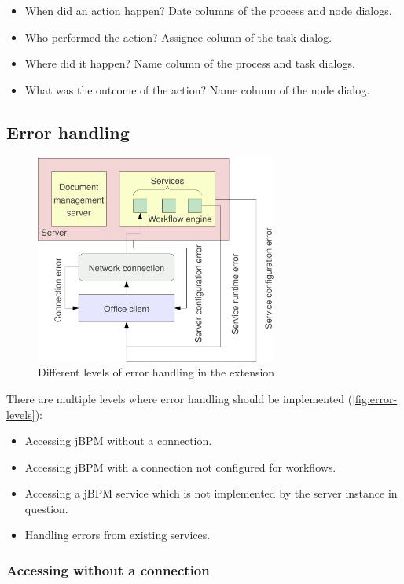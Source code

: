 \begin{itemize}
\item When did an action happen? Date columns of the process and node dialogs.
\item Who performed the action? Assignee column of the task dialog.
\item Where did it happen? Name column of the process and task dialogs.
\item What was the outcome of the action? Name column of the node dialog.
\end{itemize}

\subsection{Error handling}

\begin{figure}[H]
\centering
\includegraphics[width=300px,keepaspectratio]{error-levels.pdf}
\caption{Different levels of error handling in the extension}
\label{fig:error-levels}
\end{figure}

There are multiple levels where error handling should be implemented
(\autoref{fig:error-levels}):

\begin{itemize}
\item Accessing jBPM without a connection.
\item Accessing jBPM with a connection not configured for workflows.
\item Accessing a jBPM service which is not implemented by the server instance in question.
\item Handling errors from existing services.
\end{itemize}

\subsubsection*{Accessing without a connection}

